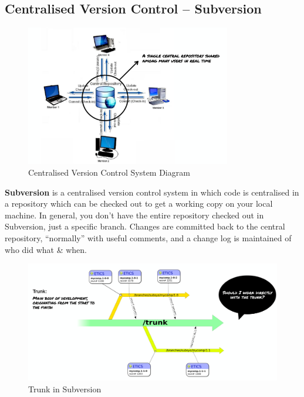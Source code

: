 \documentclass[a4paper,11pt]{article}
\begin{document}
\subsection{Centralised Version Control -- Subversion}
\begin{figure}[H]
    \centering
    \includegraphics[width=0.8\textwidth]{images/centralised_vcs.png}
    \caption{Centralised Version Control System Diagram}
\end{figure}

\textbf{Subversion} is a centralised version control system in which code is centralised in a repository which can be checked out 
to get a working copy on your local machine.
In general, you don't have the entire repository checked out in Subversion, just a specific branch.
Changes are committed back to the central repository, ``normally'' with useful comments, and a change log is maintained 
of who did what \& when.

\begin{figure}[H]
    \centering
    \includegraphics[width=\textwidth]{images/svn_trunk.png}
    \caption{Trunk in Subversion}
\end{figure}
\end{document}
